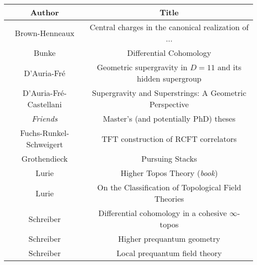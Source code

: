 \documentclass[11pt, a4paper]{report}
\begin{document}
    \begin{center}
        \begin{tabular}{|c|c|}
            \hline
            Author&Title\\
            \hline
            Brown-Henneaux&Central charges in the canonical realization of ...\\
			Bunke&Differential Cohomology\\
			D'Auria-Fr\'e&Geometric supergravity in $D=11$ and its hidden supergroup\\
			D'Auria-Fr\'e-Castellani&Supergravity and Superstrings: A Geometric Perspective\\
            \textit{Friends}&Master's (and potentially PhD) theses\\
            Fuchs-Runkel-Schweigert&TFT construction of RCFT correlators\\
            Grothendieck&Pursuing Stacks\\
            Lurie&Higher Topos Theory (\textit{book})\\
            Lurie&On the Classification of Topological Field Theories\\
            Schreiber&Differential cohomology in a cohesive $\infty$-topos\\
            Schreiber&Higher prequantum geometry\\
            Schreiber&Local prequantum field theory\\
            \hline
        \end{tabular}
    \end{center}

%
%
%
%

\nomenclature[S_zsyminto]{$]a,b[$}{open interval}

\printnomenclature

\nocite{*}



\printindex
\end{document}
